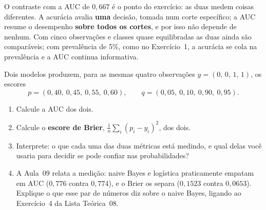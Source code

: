 \documentclass[11pt,a4paper]{article}
\begin{document}
\begin{solucao}
O contraste com a AUC de $0{,}667$ é o ponto do exercício: as duas medem coisas
diferentes. A acurácia avalia \textbf{uma} decisão, tomada num corte específico; a
AUC resume o desempenho \textbf{sobre todos os cortes}, e por isso não depende de
nenhum. Com cinco observações e classes quase equilibradas as duas ainda são
comparáveis; com prevalência de 5\%, como no Exercício~1, a acurácia se cola na
prevalência e a AUC continua informativa.
\end{solucao}

\begin{exercicio}
Dois modelos produzem, para as mesmas quatro observações
$y=(0,\,0,\,1,\,1)$, os escores
\[
  p = (0{,}40,\ 0{,}45,\ 0{,}55,\ 0{,}60),
  \qquad
  q = (0{,}05,\ 0{,}10,\ 0{,}90,\ 0{,}95).
\]
\begin{enumerate}[label=(\alph*),leftmargin=1.1cm]
  \item Calcule a AUC dos dois.
  \item Calcule o \textbf{escore de Brier}, $\frac1n\sum_i(p_i-y_i)^2$, dos dois.
  \item Interprete: o que cada uma das duas métricas está medindo, e qual delas
        você usaria para decidir se pode confiar nas probabilidades?
  \item A Aula~09 relata a medição: naive Bayes e logística praticamente empatam
        em AUC ($0{,}776$ contra $0{,}774$), e o Brier os separa ($0{,}1523$
        contra $0{,}0653$). Explique o que esse par de números diz sobre o naive
        Bayes, ligando ao Exercício~4 da Lista Teórica~08.
\end{enumerate}
\end{exercicio}
\end{document}
